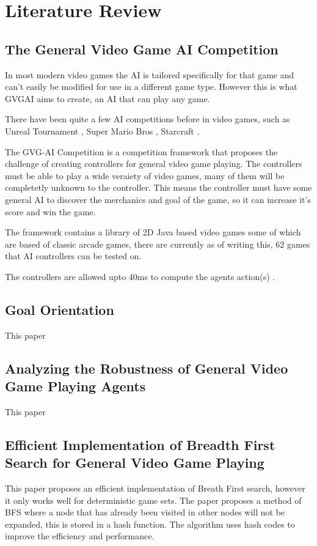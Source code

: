 \documentclass[journal]{IEEEtran}
\begin{document}
\section{Literature Review}
\subsection{The General Video Game AI Competition}

In most modern video games the AI is tailored specifically for that game and can't easily be modified for use in a different game type. However this is what GVGAI aims to create, an AI that can play any game. 

There have been quite a few AI competitions before in video games, such as Unreal Tournament \cite{hingston2010new}, Super Mario Bros \cite{citationNeeded}, Starcraft \cite{ontanon2013survey} \cite{perez20162014}. 


The GVG-AI Competition is a competition framework that proposes the challenge of creating controllers for general video game playing. The controllers must be able to play a wide veraiety of video games, many of them will be completetly unknown to the controller. This means the controller must have some general AI to discover the merchanics and goal of the game, so it can increase it's score and win the game. \cite{GVGAI, perez20162014}

The framework contains a library of 2D Java based video games some of which are based of classic arcade games, there are currently as of writing this, 62 games that AI controllers can be tested on.

The controllers are allowed upto 40ms to compute the agents action(s) \cite{perez2016GVGAICompetition, GVGAI}.

\subsection{Goal Orientation}
This paper 
\cite{ross2014general}


\subsection{Analyzing the Robustness of General Video Game Playing Agents}
This paper 
\cite{perez2016analyzing}

\subsection{Efficient Implementation of Breadth First Search for General Video Game Playing}
This paper proposes an efficient implementation of Breath First search, however it only works well for deterministic game sets.
The paper proposes a method of BFS where a node that has already been visited in other nodes will not be expanded, this is stored in a hash function.
The algorithm uses hash codes to improve the efficiency and performance.
\end{document}
